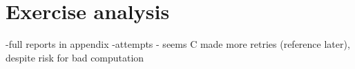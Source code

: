 \section{Exercise analysis}

-full reports in appendix 
-attempts - seems C made more retries (reference later), despite risk for bad computation